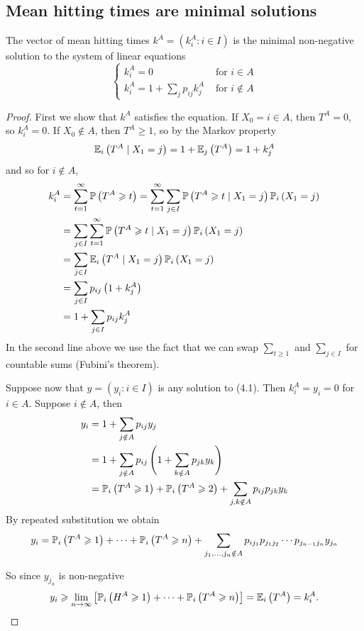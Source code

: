 \documentclass[a4paper,11pt]{article}
\begin{document}
\subsection{Mean hitting times are minimal solutions}
\begin{theorem}
    The vector of mean hitting times $k^{A}=\left(k_{i}^{A}: i \in I\right)$ is the minimal non-negative solution to the system of linear equations
    \[
    \begin{cases}k_{i}^{A}=0 & \text { for } i \in A \\ k_{i}^{A}=1+\sum_{j} p_{i j} k_{j}^{A} & \text { for } i \notin A\end{cases}
    \]
\end{theorem}
\begin{proof}
    First we show that $k^{A}$ satisfies the equation. If $X_{0}=i \in A$, then $T^{A}=0$, so $k_{i}^{A}=0$. If $X_{0} \notin A$, then $T^{A} \geq 1$, so by the Markov property
    \[
    {\mathbb{E}}_{i}\left(T^{A} \mid X_{1}=j\right)=1+{\mathbb{E}}_{j}\left(T^{A}\right)=1+k_{j}^{A}
    \]
    and so for $i \notin A$,
    \[
    \begin{aligned}
    k_{i}^{A} &=\sum_{t=1}^{\infty} {\mathbb{P}}\left(T^{A} \geqslant t\right)=\sum_{t=1}^{\infty} \sum_{j \in I} {\mathbb{P}}\left(T^{A} \geqslant t \mid X_{1}=j\right) {\mathbb{P}}_{i}\left(X_{1}=j\right) \\
    &=\sum_{j \in I} \sum_{t=1}^{\infty} {\mathbb{P}}\left(T^{A} \geqslant t \mid X_{1}=j\right) {\mathbb{P}}_{i}\left(X_{1}=j\right) \\
    &=\sum_{j \in I} {\mathbb{E}}_{i}\left(T^{A} \mid X_{1}=j\right) {\mathbb{P}}_{i}\left(X_{1}=j\right) \\
    &=\sum_{j \in I} p_{i j}\left(1+k_{j}^{A}\right) \\
    &=1+\sum_{j \in I} p_{i j} k_{j}^{A}
    \end{aligned}
    \]
    In the second line above we use the fact that we can swap $\sum_{t \geq 1}$ and $\sum_{j \in I}$ for countable sums (Fubini's theorem).

    Suppose now that $y=\left(y_{i}: i \in I\right)$ is any solution to (4.1). Then $k_{i}^{A}=y_{i}=0$ for $i \in A$. Suppose $i \notin A$, then
    \[
    \begin{aligned}
    y_{i} &=1+\sum_{j \notin A} p_{i j} y_{j} \\
    &=1+\sum_{j \notin A} p_{i j}\left(1+\sum_{k \notin A} p_{j k} y_{k}\right) \\
    &={\mathbb{P}}_{i}\left(T^{A} \geqslant 1\right)+{\mathbb{P}}_{i}\left(T^{A} \geqslant 2\right)+\sum_{j, k \notin A} p_{i j} p_{j k} y_{k}
    \end{aligned}
    \]
    By repeated substitution we obtain
    \[
    y_{i}={\mathbb{P}}_{i}\left(T^{A} \geqslant 1\right)+\cdots+{\mathbb{P}}_{i}\left(T^{A} \geqslant n\right)+\sum_{j_{1}, \ldots, j_{n} \notin A} p_{i j_{1}} p_{j_{1} j_{2}} \cdots p_{j_{n-1} j_{n}} y_{j_{n}}
    \]

    So since $y_{j_{n}}$ is non-negative
    \[
    y_{i} \geqslant \lim _{n \rightarrow \infty}\left[{\mathbb{P}}_{i}\left(H^{A} \geqslant 1\right)+\cdots+{\mathbb{P}}_{i}\left(T^{A} \geqslant n\right)\right]={\mathbb{E}}_{i}\left(T^{A}\right)=k_{i}^{A}.
    \]
\end{proof}
\end{document}
